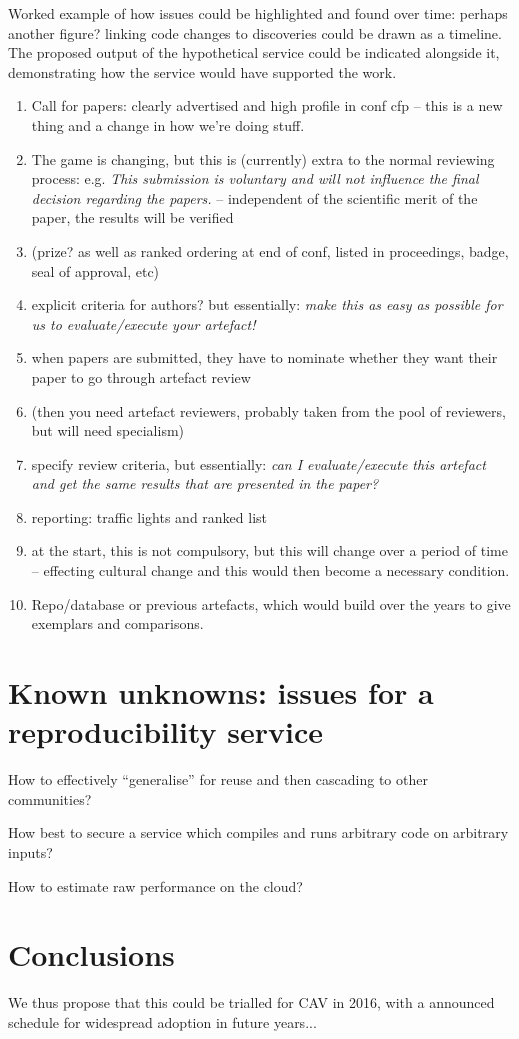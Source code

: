 \documentclass{llncs}
\begin{document}
Worked example of how issues could be highlighted and found over time: perhaps
another figure? linking code changes to discoveries could be drawn as a timeline. The 
proposed output of the hypothetical service could be indicated alongside it, 
demonstrating how the service would have supported the work.

\begin{enumerate}
\item Call for papers: clearly advertised and high profile in conf cfp
  -- this is a new thing and a change in how we're doing stuff.
\item The game is changing, but this is (currently) extra to the
  normal reviewing process: 
e.g. {\emph{This submission is voluntary and will not influence the final decision
regarding the papers.}} -- independent of the scientific merit of the
paper, the results will be verified 
\item (prize? as well as ranked ordering at end of conf, listed in
  proceedings, badge, seal of approval, etc)
\item explicit criteria for authors? but essentially: {\emph{make this
      as easy as possible for us to evaluate/execute your artefact!}}
\item when papers are submitted, they have to nominate whether they
  want their paper to go through artefact review
\item (then you need artefact reviewers, probably taken from the pool of
  reviewers, but will need specialism)
\item specify review criteria, but essentially: {\emph{can I evaluate/execute this
  artefact and get the same results that are presented in the paper?}}
\item reporting: traffic lights and ranked list
\item at the start, this is not compulsory, but this will change over a period of
time -- effecting cultural change and this would then become a
necessary condition.
\item Repo/database or previous artefacts, which would build over the
  years to give exemplars and comparisons.
\end{enumerate}

\section{Known unknowns: issues for a reproducibility service}\label{issues} 

How to effectively ``generalise'' for reuse and then cascading to other communities?

How best to secure a service which compiles and runs arbitrary code on arbitrary inputs?

How to estimate raw performance on the cloud?

\section{Conclusions}\label{concl}
We thus propose that this could be trialled for CAV in 2016, with a
announced schedule for widespread adoption in future years...



\end{document}
